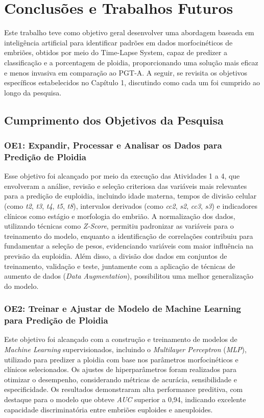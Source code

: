 \chapter[Conclusões e Trabalhos Futuros]{Conclusões e Trabalhos Futuros}

Este trabalho teve como objetivo geral desenvolver uma abordagem baseada em inteligência artificial para identificar padrões em dados morfocinéticos de embriões, obtidos por meio do Time-Lapse System, capaz de predizer a classificação e a porcentagem de ploidia, proporcionando uma solução mais eficaz e menos invasiva em comparação ao PGT-A. A seguir, se revisita os objetivos específicos estabelecidos no Capítulo 1, discutindo como cada um foi cumprido ao longo da pesquisa.

\section{Cumprimento dos Objetivos da Pesquisa}
\subsection{OE1: Expandir, Processar e Analisar os Dados para Predição de Ploidia}
Esse objetivo foi alcançado por meio da execução das Atividades 1 a 4, que envolveram a análise, revisão e seleção criteriosa das variáveis mais relevantes para a predição de euploidia, incluindo idade materna, tempos de divisão celular (como \textit{t2}, \textit{t3}, \textit{t4}, \textit{t5}, \textit{t8}), intervalos derivados (como \textit{cc2}, \textit{s2}, \textit{cc3}, \textit{s3}) e indicadores clínicos como estágio e morfologia do embrião. A normalização dos dados, utilizando técnicas como \textit{Z-Score}, permitiu padronizar as variáveis para o treinamento do modelo, enquanto a identificação de correlações contribuiu para fundamentar a seleção de pesos, evidenciando variáveis com maior influência na previsão da euploidia. Além disso, a divisão dos dados em conjuntos de treinamento, validação e teste, juntamente com a aplicação de técnicas de aumento de dados (\textit{Data Augmentation}), possibilitou uma melhor generalização do modelo.

\subsection{OE2: Treinar e Ajustar de Modelo de Machine Learning para Predição de Ploidia}
Este objetivo foi alcançado com a construção e treinamento de modelos de \textit{Machine Learning} supervisionados, incluindo o \textit{Multilayer Perceptron} (\textit{MLP}), utilizado para predizer a ploidia com base nos parâmetros morfocinéticos e clínicos selecionados. Os ajustes de hiperparâmetros foram realizados para otimizar o desempenho, considerando métricas de acurácia, sensibilidade e especificidade. Os resultados demonstraram alta performance preditiva, com destaque para o modelo que obteve \textit{AUC} superior a 0{,}94, indicando excelente capacidade discriminatória entre embriões euploides e aneuploides.

